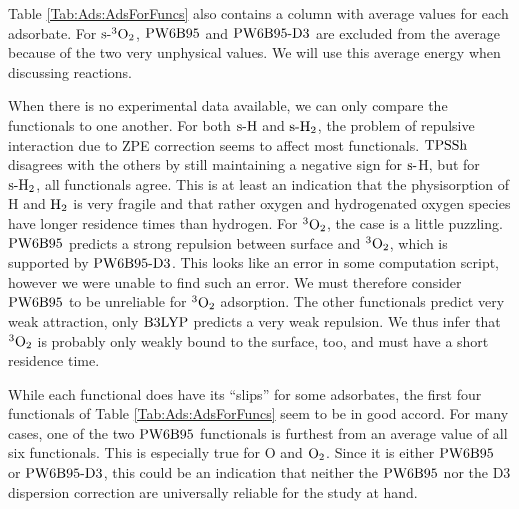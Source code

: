\documentclass[8.5pt,twoside,twocolumn]{article}
\newcommand\sur{\enmat{\te{s-}}}
\newcommand\tripot{\enmat{{^3\ot}}}
\theoremstyle{standard}
\begin{document}
Table \ref{Tab:Ads:AdsForFuncs} also contains a column with average values
for each adsorbate.
For $\sur\tripot$, $\text{PW6B95}$ and $\text{PW6B95}\text{-D3}$ are excluded from the average because of
the two very unphysical values. We will use this average energy
when discussing reactions.

When there is no experimental data available, we can only compare the
functionals to one another. For both $\sur\te H$ and $\sur\htw$, the
problem of repulsive interaction due to ZPE correction seems to affect
most functionals. $\text{TPSSh}$ disagrees with the others by still maintaining
a negative sign for $\sur$H, but for $\sur\htw$, all functionals agree.
This is at least an indication that the physisorption of H and $\text H_2$ is
very fragile and that rather oxygen and hydrogenated oxygen species
have longer residence times than hydrogen.
For $\tripot$, the case is a little puzzling. $\text{PW6B95}$ predicts a strong
repulsion between surface and $\tripot$, which is supported by
$\text{PW6B95}\text{-D3}$. This looks like an error in some computation script, however we were
unable to find such an error. We must therefore consider $\text{PW6B95}$
to be unreliable for $\tripot$ adsorption. The other
functionals predict very weak attraction, only $\text{B3LYP}$ predicts
a very weak repulsion. We thus infer that $\tripot$ is
probably only weakly bound to the surface, too, and must have a short
residence time.

While each functional does have its ``slips'' for some adsorbates, the first four functionals of
Table \ref{Tab:Ads:AdsForFuncs} seem to be in good accord. 
For many cases, one of the two $\text{PW6B95}$ functionals is furthest from an average
value of all six functionals. This is especially true for O and $\text O_2$.
Since it is either $\text{PW6B95}$ or $\text{PW6B95}\text{-D3}$, this could be an indication
that neither the $\text{PW6B95}$ nor the D3 dispersion correction are universally
reliable for the study at hand.
\end{document}
